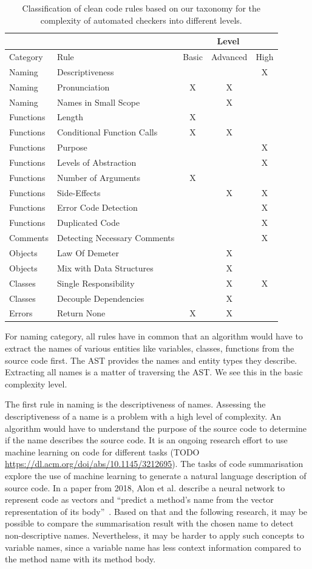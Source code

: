 \begin{table}[h]
\begin{tabularx}{\textwidth}{XXccc}
\toprule
&     & \multicolumn{3}{c}{Level} \\ \midrule
Category&Rule & Basic  & Advanced  & High \\ \midrule
Naming&Descriptiveness&&& X\\
Naming&Pronunciation&X&X& \\
Naming&Names in Small Scope&&X& \\
Functions&Length&X&&\\
Functions&Conditional Function Calls&X&X& \\
Functions&Purpose&&&X\\
Functions&Levels of Abstraction&&&X\\
Functions&Number of Arguments&X&& \\
Functions&Side-Effects&&X&X\\
Functions&Error Code Detection&&&X \\
Functions&Duplicated Code&&&X \\
Comments&Detecting Necessary Comments&&&X \\
Objects&Law Of Demeter&&X& \\
Objects&Mix with Data Structures&&X& \\
Classes&Single Responsibility&&X&X \\
Classes&Decouple Dependencies&&X& \\
Errors&Return None&X&X& \\
\bottomrule
\end{tabularx}
\caption{Classification of clean code rules based on our taxonomy for the complexity of automated checkers into different levels.}
\label{tab:complexity_level_overview}
\end{table}


For naming category, all rules have in common that an algorithm would have to extract the names of various entities like variables, classes, functions from the source code first. The AST provides the names and entity types they describe. Extracting all names is a matter of traversing the AST. We see this in the basic complexity level.

The first rule in naming is the descriptiveness of names. Assessing the descriptiveness of a name is a problem with a high level of complexity. An algorithm would have to understand the purpose of the source code to determine if the name describes the source code. It is an ongoing research effort to use machine learning on code for different tasks (TODO \url{https://dl.acm.org/doi/abs/10.1145/3212695}). The tasks of code summarisation explore the use of machine learning to generate a natural language description of source code. In a paper from 2018, Alon et al. describe a neural network to represent code as vectors and \enquote{predict a method’s name from the vector representation of its body}~\cite{alon_code2vec_2018}. Based on that and the following research, it may be possible to compare the summarisation result with the chosen name to detect non-descriptive names. Nevertheless, it may be harder to apply such concepts to variable names, since a variable name has less context information compared to the method name with its method body.

